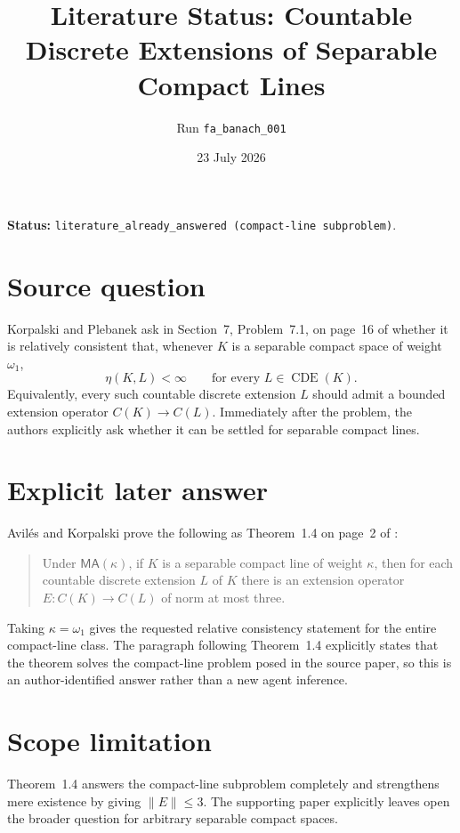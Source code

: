 \documentclass[11pt]{article}
\title{Literature Status: Countable Discrete Extensions of Separable Compact Lines}
\author{Run \texttt{fa\_banach\_001}}
\date{23 July 2026}
\begin{document}
\maketitle

\textbf{Status:} \texttt{literature\_already\_answered (compact-line subproblem)}.

\section*{Source question}

Korpalski and Plebanek ask in Section~7, Problem~7.1, on page~16 of
\cite{KP} whether it is relatively consistent that, whenever \(K\) is a
separable compact space of weight \(\omega_1\),
\[
  \eta(K,L)<\infty \qquad\text{for every }L\in\operatorname{CDE}(K).
\]
Equivalently, every such countable discrete extension \(L\) should admit a
bounded extension operator \(C(K)\to C(L)\).  Immediately after the problem,
the authors explicitly ask whether it can be settled for separable compact
lines.

\section*{Explicit later answer}

Avil\'es and Korpalski prove the following as Theorem~1.4 on page~2 of
\cite{AK}:

\begin{quote}
Under \(\mathsf{MA}(\kappa)\), if \(K\) is a separable compact line of weight
\(\kappa\), then for each countable discrete extension \(L\) of \(K\) there is
an extension operator \(E:C(K)\to C(L)\) of norm at most three.
\end{quote}

Taking \(\kappa=\omega_1\) gives the requested relative consistency statement
for the entire compact-line class.  The paragraph following Theorem~1.4
explicitly states that the theorem solves the compact-line problem posed in
the source paper, so this is an author-identified answer rather than a new
agent inference.

\section*{Scope limitation}

Theorem~1.4 answers the compact-line subproblem completely and strengthens
mere existence by giving \(\lVert E\rVert\leq 3\).  The supporting paper
explicitly leaves open the broader question for arbitrary separable compact
spaces.
\end{document}
